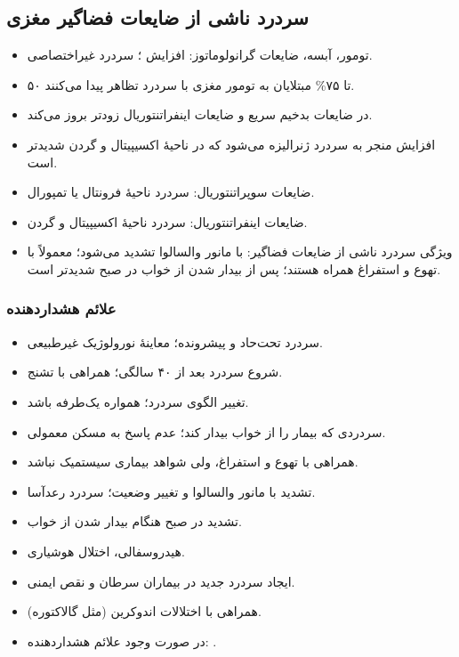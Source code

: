 \subsection{سردرد ناشی از ضایعات فضاگیر مغزی}
\begin{itemize}
\item تومور، آبسه، ضایعات گرانولوماتوز: افزایش ؛ سردرد غیراختصاصی.
\item ۵۰ تا ۷۵\% مبتلایان به تومور مغزی با سردرد تظاهر پیدا می‌کنند.
\item در ضایعات بدخیم سریع و ضایعات اینفراتنتوریال زودتر بروز می‌کند.
\item افزایش  منجر به سردرد ژنرالیزه می‌شود که در ناحیهٔ اکسیپیتال و گردن شدیدتر است.
\item ضایعات سوپراتنتوریال: سردرد ناحیهٔ فرونتال یا تمپورال.
\item ضایعات اینفراتنتوریال: سردرد ناحیهٔ اکسیپیتال و گردن.
\item ویژگی سردرد ناشی از ضایعات فضاگیر: با مانور والسالوا تشدید می‌شود؛ معمولاً با تهوع و استفراغ همراه هستند؛ پس از بیدار شدن از خواب در صبح شدیدتر است.
\end{itemize}
\subsubsection{علائم هشداردهنده}
\begin{itemize}
\item سردرد تحت‌حاد و پیشرونده؛ معاینهٔ نورولوژیک غیرطبیعی.
\item شروع سردرد بعد از ۴۰ سالگی؛ همراهی با تشنج.
\item تغییر الگوی سردرد؛ همواره یک‌طرفه باشد.
\item سردردی که بیمار را از خواب بیدار کند؛ عدم پاسخ به مسکن معمولی.
\item همراهی با تهوع و استفراغ، ولی شواهد بیماری سیستمیک نباشد.
\item تشدید با مانور والسالوا و تغییر وضعیت؛ سردرد رعدآسا.
\item تشدید در صبح هنگام بیدار شدن از خواب.
\item هیدروسفالی، اختلال هوشیاری.
\end{itemize}

\begin{itemize}
\item ایجاد سردرد جدید در بیماران سرطان و نقص ایمنی.
\item همراهی با اختلالات اندوکرین (مثل گالاکتوره).
\item در صورت وجود علائم هشداردهنده: .
\end{itemize}
